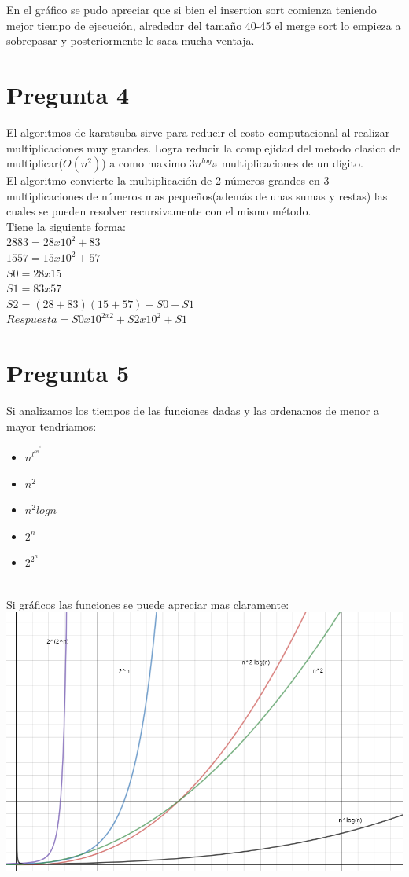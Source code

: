 \documentclass{article}
\begin{document}
En el gráfico se pudo apreciar que si bien el insertion sort comienza teniendo mejor tiempo de ejecución, alrededor del tamaño 40-45 el merge sort lo empieza a sobrepasar y posteriormente le saca mucha ventaja.
\section{Pregunta 4}
El algoritmos de karatsuba sirve para reducir el costo computacional al realizar multiplicaciones muy grandes. Logra reducir la complejidad del metodo clasico de multiplicar($O(n^2)$) a como maximo $3n^{log_23}$ multiplicaciones de un dígito.\\
El algoritmo convierte la multiplicación de 2 números grandes en 3 multiplicaciones de números mas pequeños(además de unas sumas y restas) las cuales se pueden resolver recursivamente con el mismo método.\\
Tiene la siguiente forma:\\
$2883 = 28 x 10^2 + 83$\\
$1557 = 15 x 10^2 + 57$\\
$S0=28 x 15$\\
$S1=83 x 57$\\
$S2=(28+83)(15+57) - S0 - S1 $\\
$Respuesta=S0 x 10^{2x2} + S2 x 10^2 + S1$\\

\section{Pregunta 5}

Si analizamos los tiempos de las funciones dadas y las ordenamos de menor a mayor tendríamos:
\begin{itemize}
    \item $n^l^o^g^(^n^)$
    \item $n^2$
    \item $n^2logn$
    \item $2^n$
    \item $2^{2^n}$
\end{itemize}\\
Si gráficos las funciones se puede apreciar mas claramente:\\
\includegraphics[width=\textwidth]{grafica.png}\\
\end{document}
